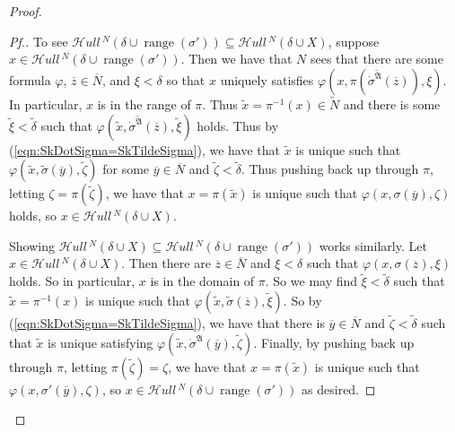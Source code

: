 \documentclass{amsart}
\theoremstyle{definition}
\theoremstyle{remark}
\newcommand{\N}{{\overline{N}}}
\DeclareMathOperator{\ran}{range}
\newcommand{\SH}{\mathcal{H}\textit{ull} \,}
\newcommand{\sk}[3]{\SH^{#1}( {#2} \cup {\ran(#3)} ) }
\newcommand{\Sk}[3]{\SH^{#1}( {#2} \cup {#3} ) }
\begin{document}
\begin{proof}
\begin{proof}[Pf.]
To see $\sk{N}{\delta}{\sigma'} \subseteq \Sk{N}{\delta}{X}$, suppose $x \in \sk{N}{\delta}{\sigma'}$. Then we have that $N$ sees that there are some formula $\varphi$, $\overline z \in \N$, and $\xi < \delta$ so that $x$ uniquely satisfies $\varphi(x, \pi(\dot \sigma^{\tilde{\mathfrak A}}(\overline z)), \xi)$. In particular, $x$ is in the range of $\pi$. 
Thus $\tilde x = \pi^{-1}(x) \in \tilde N$ and there is some $\tilde \xi < \tilde \delta$ such that $\varphi(\tilde x, \dot \sigma^{\tilde{\mathfrak A}}(\overline z), \tilde \xi)$ holds. Thus by (\ref{eqn:SkDotSigma=SkTildeSigma}), we have that $\tilde x$ is unique such that 
$\varphi(\tilde x, \tilde \sigma(\overline y), \tilde \zeta)$ for some $\overline y \in \N$ and $\tilde \zeta < \tilde \delta$. Thus pushing back up through $\pi$, letting $\zeta = \pi(\tilde \zeta)$, we have that $x = \pi(\tilde x)$ is unique such that $\varphi(x, \sigma(\overline y), \zeta)$ holds, so $x \in \Sk{N}{\delta}{X}$.

Showing $\Sk{N}{\delta}{X} \subseteq \sk{N}{\delta}{\sigma'}$ works similarly. Let $x \in \Sk{N}{\delta}{X}$. Then there are $\overline z \in \N$ and $\xi < \delta$ such that $\varphi(x, \sigma(\overline z), \xi)$ holds. So in particular, $x$ is in the domain of $\pi$. 
So we may find $\tilde \xi < \tilde \delta$ such that $\tilde x = \pi^{-1}(x)$ is unique such that $\varphi(\tilde x, \tilde \sigma(\overline z), \tilde \xi)$. So by (\ref{eqn:SkDotSigma=SkTildeSigma}), we have that there is $\overline y \in \N$ and $\tilde \zeta < \tilde \delta$ such that $\tilde x$ is unique satisfying $\varphi(\tilde x, \dot{\sigma}^{\mathfrak A}(\overline y), \tilde \zeta)$. Finally, by pushing back up through $\pi$, letting $\pi(\tilde \zeta) = \zeta$, we have that $x = \pi(\tilde x)$ is unique such that $\varphi(x, \sigma'(\overline y), \zeta)$, so $x \in \sk{N}{\delta}{\sigma'}$ as desired.



\end{proof}
\end{proof}
\end{document}
